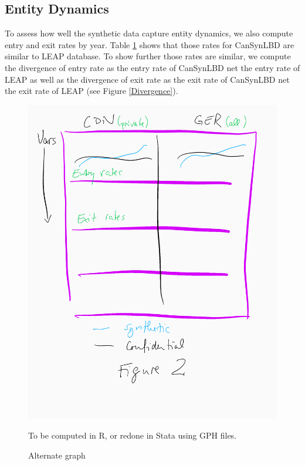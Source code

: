 \subsection{Entity Dynamics}
To assess how well the synthetic data capture entity dynamics, we also compute entry and exit rates  by year. Table \ref{tab:Can:FirmDynamics} shows that those rates for CanSynLBD are similar to LEAP database. To show further those rates are similar, we compute the divergence of entry rate as the entry rate of CanSynLBD net the entry rate of LEAP as well as the divergence of exit rate as the exit rate of CanSynLBD net the exit rate of LEAP (see Figure \ref{Divergence}).

\begin{figure} [H]
\centering
\label{tab:Can:FirmDynamics}
\includegraphics[width=.8\linewidth]{graphs/Figure2-placeholder.png} 
\caption{Alternate graph} 
\begin{minipage}{0.48\linewidth}
{\footnotesize To be computed in R, or redone in Stata using GPH files. \par}
\end{minipage}
\end{figure}

